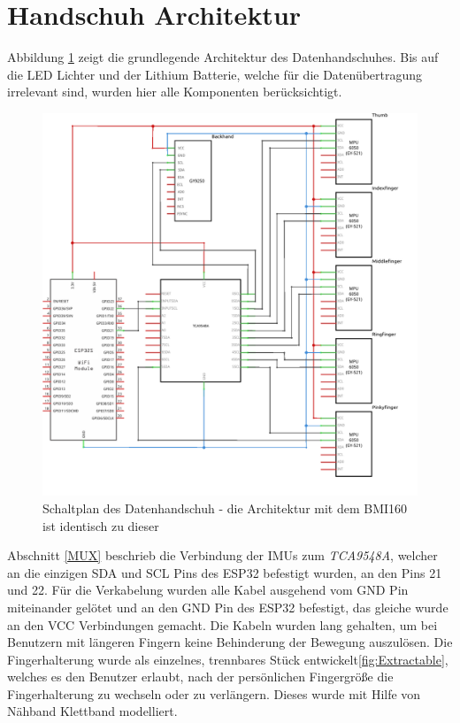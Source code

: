 \section{Handschuh Architektur}
Abbildung \ref{fig:GloveArchitektur} zeigt die grundlegende Architektur des Datenhandschuhes. Bis auf die LED Lichter und der Lithium Batterie, welche für die Datenübertragung irrelevant sind, wurden hier alle Komponenten berücksichtigt. 
\begin{figure}[h]
	\centering
    \includegraphics[width=1\columnwidth]{Bachelorarbeit/images/Handarchitektur1.png}
    \caption{Schaltplan des Datenhandschuh - die Architektur mit dem BMI160 ist identisch zu dieser}
    \label{fig:GloveArchitektur}
\end{figure}

Abschnitt \ref{MUX} beschrieb die Verbindung der IMUs zum \textit{TCA9548A}, welcher an die einzigen SDA und SCL Pins des ESP32 befestigt wurden, an den Pins 21 und 22. Für die Verkabelung wurden alle Kabel ausgehend vom GND Pin miteinander gelötet und an den GND Pin des ESP32 befestigt, das gleiche wurde an den VCC Verbindungen gemacht. Die Kabeln wurden lang gehalten, um bei Benutzern mit längeren Fingern keine Behinderung der Bewegung auszulösen. Die Fingerhalterung wurde als einzelnes, trennbares Stück entwickelt\ref{fig:Extractable}, welches es den Benutzer erlaubt, nach der persönlichen Fingergröße die Fingerhalterung zu wechseln oder zu verlängern. Dieses wurde mit Hilfe von Nähband Klettband modelliert.

